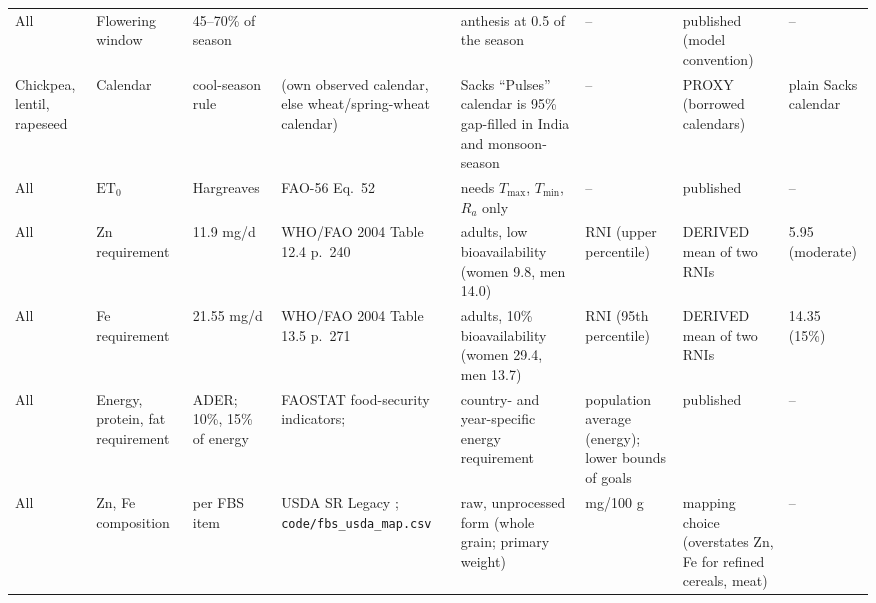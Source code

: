 {\begin{longtable}{L{0.091}L{0.098}L{0.098}L{0.171}L{0.183}L{0.140}L{0.122}L{0.098}}
All & Flowering window & 45--70\% of season & \citet{deryng2014} & anthesis at 0.5 of the season & -- & published (model convention) & -- \\
Chickpea, lentil, rapeseed & Calendar & cool-season rule & \citet{sacks2010} (own observed calendar, else wheat/spring-wheat calendar) & Sacks ``Pulses'' calendar is 95\% gap-filled in India and monsoon-season & -- & PROXY (borrowed calendars) & plain Sacks calendar \\
All & $\mathrm{ET_0}$ & Hargreaves & FAO-56 Eq.~52 \citep{fao56} & needs $T_{\max}$, $T_{\min}$, $R_a$ only & -- & published & -- \\
All & Zn requirement & 11.9 mg/d & WHO/FAO 2004 Table 12.4 p.~240 \citep{whofao2004} & adults, low bioavailability (women 9.8, men 14.0) & RNI (upper percentile) & DERIVED mean of two RNIs & 5.95 (moderate) \\
All & Fe requirement & 21.55 mg/d & WHO/FAO 2004 Table 13.5 p.~271 & adults, 10\% bioavailability (women 29.4, men 13.7) & RNI (95th percentile) & DERIVED mean of two RNIs & 14.35 (15\%) \\
All & Energy, protein, fat requirement & ADER; 10\%, 15\% of energy & FAOSTAT food-security indicators; \citet{who2003} & country- and year-specific energy requirement & population average (energy); lower bounds of goals & published & -- \\
All & Zn, Fe composition & per FBS item & USDA SR Legacy \citep{usda2019}; \texttt{code/fbs\_usda\_map.csv} & raw, unprocessed form (whole grain; primary weight) & mg/100 g & mapping choice (overstates Zn, Fe for refined cereals, meat) & -- \\
\end{longtable}}
